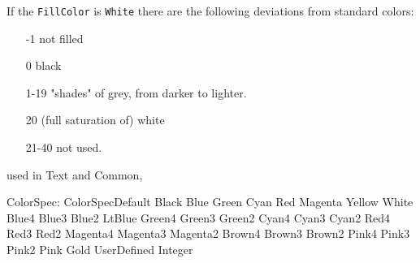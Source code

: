 \documentclass[10pt, a4paper]{article}
\begin{document}
If the {\tt FillColor} is {\tt White} there are the following deviations 
from standard colors: 
%
\begin{enumerate}
\item[-1]    not filled
\item[0]     black
\item[1-19]  "shades" of grey, from darker to lighter.
\item[20]    (full saturation of) white
\item[21-40] not used. 
\end{enumerate}



used in Text and Common, 

ColorSpec:
ColorSpecDefault	 
Black	 
Blue	 
Green	 
Cyan	 
Red	 
Magenta	 
Yellow	 
White	 
Blue4	 
Blue3	 
Blue2	 
LtBlue	 
Green4	 
Green3	 
Green2	 
Cyan4	 
Cyan3	 
Cyan2	 
Red4	 
Red3	 
Red2	 
Magenta4	 
Magenta3	 
Magenta2	 
Brown4	 
Brown3	 
Brown2	 
Pink4	 
Pink3	 
Pink2	 
Pink	 
Gold	 
UserDefined Integer	 


{}
\end{document}
